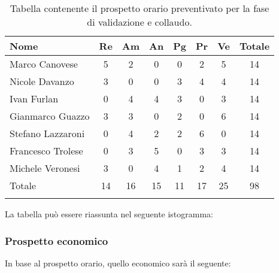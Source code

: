 			\begin{longtable}{|l|c|c|c|c|c|c|c|}
				\hline
				\rowcolor{lighter-grayer}
				\textbf{Nome} & \textbf{Re} & \textbf{Am} & \textbf{An} & \textbf{Pg}  & \textbf{Pr}   & \textbf{Ve} & \textbf{Totale} \\
				\hline
				\endfirsthead
				
				\hline
				Marco Canovese & 5 & 2 & 0 & 0 & 2 & 5 & 14\\
				\hline
				\hline
				Nicole Davanzo & 3 & 0 & 0 & 3 & 4 & 4 & 14\\
				\hline
				\hline
				Ivan Furlan & 0 & 4 & 4 & 3 & 0 & 3 & 14\\
				\hline
				\hline
				Gianmarco Guazzo & 3 & 3 & 0 & 2 & 0 & 6 & 14\\
				\hline
				\hline
				Stefano Lazzaroni & 0 & 4 & 2 & 2 & 6 & 0 & 14\\
				\hline
				\hline
				Francesco Trolese & 0 & 3 & 5 & 0 & 3 & 3 & 14\\
				\hline
				\hline
				Michele Veronesi & 3 & 0 & 4 & 1 & 2 & 4 & 14\\
				\hline 
				\hline
				Totale & 14 & 16 & 15 & 11 & 17 & 25 & 98\\
				\hline 
				\caption{Tabella contenente il prospetto orario preventivato per la fase di validazione e collaudo.}
			\end{longtable}

		
			La tabella può essere riassunta nel seguente istogramma:
		
		
			\subsubsection{Prospetto economico}
			In base al prospetto orario, quello economico sarà il seguente: 
			
